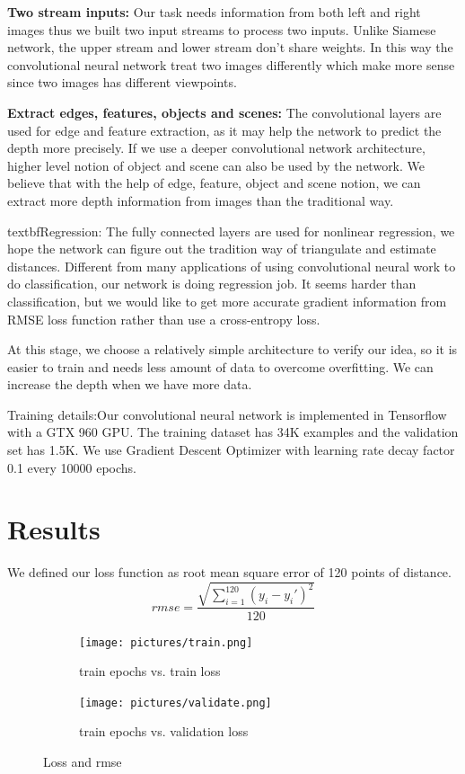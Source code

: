 \documentclass[10pt,twocolumn,letterpaper]{article}
\begin{document}
\textbf{Two stream inputs:} Our task needs information from both left and right images thus we built two input streams to process two inputs. Unlike Siamese network, the upper stream and lower stream don’t share weights. In this way the convolutional neural network treat two images differently which make more sense since two images has different viewpoints. 


\textbf{Extract edges, features, objects and scenes:} The convolutional layers are used for edge and feature extraction, as it may help the network to predict the depth more precisely. If we use a deeper convolutional network architecture, higher level notion of object and scene can also be used by the network. We believe that with the help of edge, feature, object and scene notion, we can extract more depth information from images than the traditional way.


textbf{Regression:} The fully connected layers are used for nonlinear regression, we hope the network can figure out the tradition way of triangulate and estimate distances. Different from many applications of using convolutional neural work to do classification, our network is doing regression job. It seems harder than classification, but we would like to get more accurate gradient information from RMSE loss function rather than use a cross-entropy loss.


At this stage, we choose a relatively simple architecture to verify our idea, so it is easier to train and needs less amount of data to overcome overfitting. We can increase the depth when we have more data. 


Training details:Our convolutional neural network is implemented in Tensorflow  with a GTX 960 GPU. The training dataset has 34K examples and the validation set has 1.5K. We use Gradient Descent Optimizer with learning rate decay factor 0.1 every 10000 epochs. 

\section{Results}
We defined our loss function as root mean square error of 120 points of distance.
\begin{equation*}
rmse =\frac{\sqrt{\sum\limits_{i=1}^{120} (y_i-y_i')^2}}{120}
\end{equation*}

\begin{figure}
	\begin{subfigure}{.25\textwidth}
		\centering
		\texttt{[image: pictures/train.png]}
		\caption{train epochs vs. train loss}
		\label{loss}
	\end{subfigure}%
	\begin{subfigure}{.25\textwidth}
		\centering
		\texttt{[image: pictures/validate.png]}
		\caption{train epochs vs. validation loss}
		\label{rmse}
	\end{subfigure}
	\caption{Loss and rmse}
	\label{result}
\end{figure}
\end{document}
